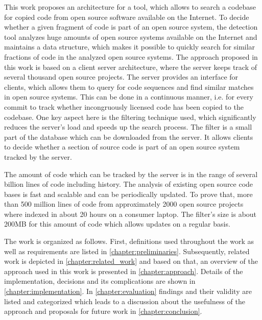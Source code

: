 This work proposes an architecture for a tool, which allows to search a codebase for copied code from open source software available on the Internet.
To decide whether a given fragment of code is part of an open source system, the detection tool analyzes huge amounts of open source systems available on the Internet and maintains a data structure, which makes it possible to quickly search for similar fractions of code in the analyzed open source systems.
The approach proposed in this work is based on a client server architecture, where the server keeps track of several thousand open source projects.
The server provides an interface for clients, which allows them to query for code sequences and find similar matches in open source systems.
This can be done in a continuous manner, i.e. for every commit to track whether incongruously licensed code has been copied to the codebase.
One key aspect here is the filtering technique used, which significantly reduces the server's load and speeds up the search process.
The filter is a small part of the database which can be downloaded from the server.
It allows clients to decide whether a section of source code is part of an open source system tracked by the server.


The amount of code which can be tracked by the server is in the range of several billion lines of code including history.
The analysis of existing open source code bases is fast and scalable and can be periodically updated.
To prove that, more than 500 million lines of code from approximately 2000 open source projects where indexed in about 20 hours on a consumer laptop.
The filter's size is about 200MB for this amount of code which allows updates on a regular basis.


The work is organized as follows.
First, definitions used throughout the work as well as requirements are listed in \autoref{chapter:preliminaries}.
Subsequently, related work is depicted in \autoref{chapter:related_work} and based on that, an overview of the approach used in this work is presented in \autoref{chapter:approach}.
Details of the implementation, decisions and its complications are shown in \autoref{chapter:implementation}.
In \autoref{chapter:evaluation} findings and their validity are listed and categorized which leads to a discussion about the usefulness of the approach and proposals for future work in \autoref{chapter:conclusion}.